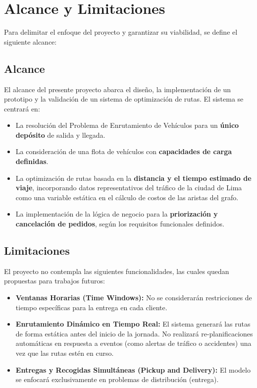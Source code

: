 \section{Alcance y Limitaciones}
Para delimitar el enfoque del proyecto y garantizar su viabilidad, se define el siguiente alcance:

\subsection{Alcance}
El alcance del presente proyecto abarca el diseño, la implementación de un prototipo y la validación de un sistema de optimización de rutas. El sistema se centrará en:
\begin{itemize}
    \item La resolución del Problema de Enrutamiento de Vehículos para un \textbf{único depósito} de salida y llegada.
    \item La consideración de una flota de vehículos con \textbf{capacidades de carga definidas}.
    \item La optimización de rutas basada en la \textbf{distancia y el tiempo estimado de viaje}, incorporando datos representativos del tráfico de la ciudad de Lima como una variable estática en el cálculo de costos de las aristas del grafo.
    \item La implementación de la lógica de negocio para la \textbf{priorización y cancelación de pedidos}, según los requisitos funcionales definidos.
\end{itemize}

\subsection{Limitaciones}
El proyecto no contempla las siguientes funcionalidades, las cuales quedan propuestas para trabajos futuros:
\begin{itemize}
    \item \textbf{Ventanas Horarias (Time Windows):} No se considerarán restricciones de tiempo específicas para la entrega en cada cliente.
    \item \textbf{Enrutamiento Dinámico en Tiempo Real:} El sistema generará las rutas de forma estática antes del inicio de la jornada. No realizará re-planificaciones automáticas en respuesta a eventos (como alertas de tráfico o accidentes) una vez que las rutas estén en curso.
    \item \textbf{Entregas y Recogidas Simultáneas (Pickup and Delivery):} El modelo se enfocará exclusivamente en problemas de distribución (entrega).
\end{itemize}